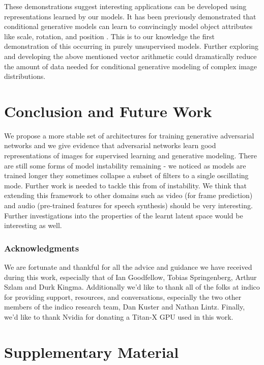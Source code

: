 \documentclass{article} \usepackage{iclr2016_conference,times}
\begin{document}
These demonstrations suggest interesting applications can be developed using  representations learned by our models. It has been previously demonstrated that conditional generative models can learn to convincingly model object attributes like scale, rotation, and position \citep{dosovitskiy2014learning}. This is to our knowledge the first demonstration of this occurring in purely unsupervised models. Further exploring and developing the above mentioned vector arithmetic could dramatically reduce the amount of data needed for conditional generative modeling of complex image distributions.




\section{Conclusion and Future Work}

We propose a more stable set of architectures for training generative adversarial networks and we give evidence that adversarial networks learn good representations of images for supervised learning and generative modeling. There are still some forms of model instability remaining - we noticed as models are trained longer they sometimes collapse a subset of filters to a single oscillating mode. Further work is needed to tackle this from of instability. We think that extending this framework to other domains such as video (for frame prediction) and audio (pre-trained features for speech synthesis) should be very interesting. Further investigations into the properties of the learnt latent space would be interesting as well.
\subsubsection*{Acknowledgments}

We are fortunate and thankful for all the advice and guidance we have received during this work, especially that of Ian Goodfellow, Tobias Springenberg, Arthur Szlam and Durk Kingma. Additionally we'd like to thank all of the folks at indico for providing support, resources, and conversations, especially the two other members of the indico research team, Dan Kuster and Nathan Lintz. Finally, we'd like to thank Nvidia for donating a Titan-X GPU used in this work.




\newpage

\section{Supplementary Material}
\end{document}
